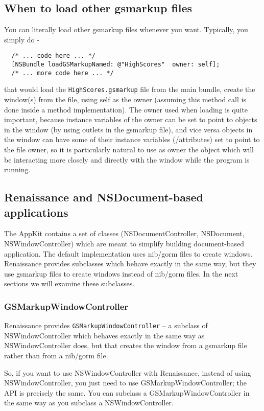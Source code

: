 \subsection{When to load other gsmarkup files}
You can literally load other gsmarkup files whenever you want.
Typically, you simply do -
\begin{verbatim}
  /* ... code here ... */
  [NSBundle loadGSMarkupNamed: @"HighScores"  owner: self];  
  /* ... more code here ... */
\end{verbatim}
that would load the \texttt{HighScores.gsmarkup} file from the main
bundle, create the window(s) from the file, using self as the owner
(assuming this method call is done inside a method implementation).
The owner used when loading is quite important, because instance
variables of the owner can be set to point to objects in the window
(by using outlets in the gsmarkup file), and vice versa objects in the
window can have some of their instance variables (/attributes) set to
point to the file owner, so it is particularly natural to use as owner
the object which will be interacting more closely and directly with
the window while the program is running.

\subsection{Renaissance and NSDocument-based applications}
The AppKit contains a set of classes (NSDocumentController,
NSDocument, NSWindowController) which are meant to simplify building
document-based application.  The default implementation uses nib/gorm
files to create windows.  Renaissance provides subclasses which behave
exactly in the same way, but they use gsmarkup files to create windows
instead of nib/gorm files.  In the next sections we will examine these
subclasses.

\subsubsection{GSMarkupWindowController}
Renaissance provides \texttt{GSMarkupWindowController} -- a subclass
of NSWindowController which behaves exactly in the same way as
NSWindowController does, but that creates the window from a gsmarkup
file rather than from a nib/gorm file.

So, if you want to use NSWindowController with Renaissance, instead of
using NSWindowController, you just need to use
GSMarkupWindowController; the API is precisely the same.  You can
subclass a GSMarkupWindowController in the same way as you subclass a
NSWindowController.

